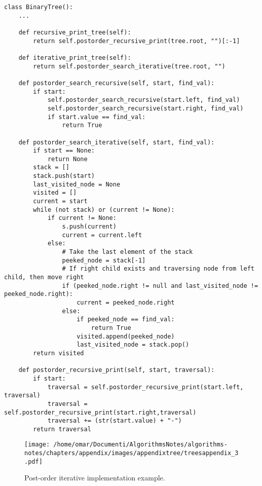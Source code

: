 \begin{lstlisting}[firstnumber=1, caption={Recursive and iterative implementation of post-order traversal.}]
class BinaryTree():
	...

	def recursive_print_tree(self):
		return self.postorder_recursive_print(tree.root, "")[:-1]
	
	def iterative_print_tree(self):
		return self.postorder_search_iterative(tree.root, "")

	def postorder_search_recursive(self, start, find_val):
		if start:
			self.postorder_search_recursive(start.left, find_val)
			self.postorder_search_recursive(start.right, find_val)
			if start.value == find_val:
				return True

	def postorder_search_iterative(self, start, find_val):
		if start == None:
			return None
		stack = []
		stack.push(start)
		last_visited_node = None
		visited = []
		current = start
		while (not stack) or (current != None):
			if current != None:
				s.push(current)
				current = current.left
			else:
				# Take the last element of the stack
				peeked_node = stack[-1]
				# If right child exists and traversing node from left child, then move right
				if (peeked_node.right != null and last_visited_node != peeked_node.right):
					current = peeked_node.right
				else:
					if peeked_node == find_val:
						return True
					visited.append(peeked_node)
					last_visited_node = stack.pop()
		return visited

	def postorder_recursive_print(self, start, traversal):
		if start:
			traversal = self.postorder_recursive_print(start.left, traversal)
			traversal = self.postorder_recursive_print(start.right,traversal)
			traversal += (str(start.value) + "-")
		return traversal
\end{lstlisting}

\begin{figure}[H]
	\begin{center}
		\texttt{[image: /home/omar/Documenti/AlgorithmsNotes/algorithms-notes/chapters/appendix/images/appendixtree/treesappendix\_3.pdf]}
		\caption[Post-order iterative implementation example.]{Post-order iterative implementation example.}
		\label{appendixtrees_3}
	\end{center}
\end{figure}